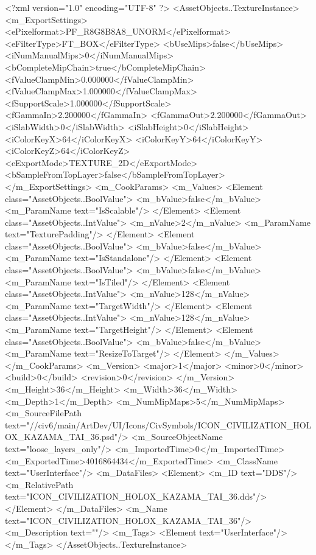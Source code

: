 <?xml version="1.0" encoding="UTF-8" ?>
<AssetObjects..TextureInstance>
	<m_ExportSettings>
		<ePixelformat>PF_R8G8B8A8_UNORM</ePixelformat>
		<eFilterType>FT_BOX</eFilterType>
		<bUseMips>false</bUseMips>
		<iNumManualMips>0</iNumManualMips>
		<bCompleteMipChain>true</bCompleteMipChain>
		<fValueClampMin>0.000000</fValueClampMin>
		<fValueClampMax>1.000000</fValueClampMax>
		<fSupportScale>1.000000</fSupportScale>
		<fGammaIn>2.200000</fGammaIn>
		<fGammaOut>2.200000</fGammaOut>
		<iSlabWidth>0</iSlabWidth>
		<iSlabHeight>0</iSlabHeight>
		<iColorKeyX>64</iColorKeyX>
		<iColorKeyY>64</iColorKeyY>
		<iColorKeyZ>64</iColorKeyZ>
		<eExportMode>TEXTURE_2D</eExportMode>
		<bSampleFromTopLayer>false</bSampleFromTopLayer>
	</m_ExportSettings>
	<m_CookParams>
		<m_Values>
			<Element class="AssetObjects..BoolValue">
				<m_bValue>false</m_bValue>
				<m_ParamName text="IsScalable"/>
			</Element>
			<Element class="AssetObjects..IntValue">
				<m_nValue>2</m_nValue>
				<m_ParamName text="TexturePadding"/>
			</Element>
			<Element class="AssetObjects..BoolValue">
				<m_bValue>false</m_bValue>
				<m_ParamName text="IsStandalone"/>
			</Element>
			<Element class="AssetObjects..BoolValue">
				<m_bValue>false</m_bValue>
				<m_ParamName text="IsTiled"/>
			</Element>
			<Element class="AssetObjects..IntValue">
				<m_nValue>128</m_nValue>
				<m_ParamName text="TargetWidth"/>
			</Element>
			<Element class="AssetObjects..IntValue">
				<m_nValue>128</m_nValue>
				<m_ParamName text="TargetHeight"/>
			</Element>
			<Element class="AssetObjects..BoolValue">
				<m_bValue>false</m_bValue>
				<m_ParamName text="ResizeToTarget"/>
			</Element>
		</m_Values>
	</m_CookParams>
	<m_Version>
		<major>1</major>
		<minor>0</minor>
		<build>0</build>
		<revision>0</revision>
	</m_Version>
	<m_Height>36</m_Height>
	<m_Width>36</m_Width>
	<m_Depth>1</m_Depth>
	<m_NumMipMaps>5</m_NumMipMaps>
	<m_SourceFilePath text="//civ6/main/ArtDev/UI/Icons/CivSymbols/ICON_CIVILIZATION_HOLOX_KAZAMA_TAI_36.psd"/>
	<m_SourceObjectName text="loose_layers_only"/>
	<m_ImportedTime>0</m_ImportedTime>
	<m_ExportedTime>4016864434</m_ExportedTime>
	<m_ClassName text="UserInterface"/>
	<m_DataFiles>
		<Element>
			<m_ID text="DDS"/>
			<m_RelativePath text="ICON_CIVILIZATION_HOLOX_KAZAMA_TAI_36.dds"/>
		</Element>
	</m_DataFiles>
	<m_Name text="ICON_CIVILIZATION_HOLOX_KAZAMA_TAI_36"/>
	<m_Description text=""/>
	<m_Tags>
		<Element text="UserInterface"/>
	</m_Tags>
</AssetObjects..TextureInstance>

